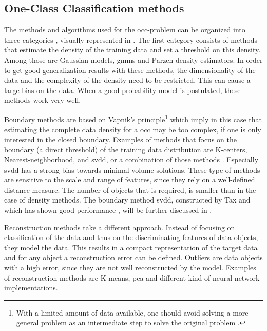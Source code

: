 \subsection{One-Class Classification methods}\label{subsec:occ-methods}
The methods and algorithms used for the \gls{occ}-problem can be organized into three categories \cite{tax2001one,noumir2012simple}, visually represented in .
The first category consists of methods that estimate the density of the training data and set a threshold on this density.
Among those are Gaussian models, \glspl{gmm} and Parzen density estimators.
In order to get good generalization results with these methods, the dimensionality of the data and the complexity of the density need to be restricted.
This can cause a large bias on the data.
When a good probability model is postulated, these methods work very well. %

Boundary methods are based on Vapnik's principle\footnote{With a limited amount of data available, one should avoid solving a more general problem as an intermediate step to solve the original problem \cite{vapnik1998statistical}.} which imply in this case that estimating the complete data density for a \gls{occ} may be too complex, if one is only interested in the closed boundary.
Examples of methods that focus on the boundary (a direct threshold) of the training data distribution are K-centers, Nearest-neighborhood, and \gls{svdd}, or a combination of those methods \cite{hempstalk2008one}.
Especially \gls{svdd} has a strong bias towards minimal volume solutions.
These type of methods are sensitive to the scale and range of features, since they rely on a well-defined distance measure.
The number of objects that is required, is smaller than in the case of density methods.
The boundary method \gls{svdd}, constructed by Tax and which has shown good performance \cite{khan2010survey}, will be further discussed in .

Reconstruction methods take a different approach.
Instead of focusing on classification of the data and thus on the discriminating features of data objects, they model the data.
This results in a compact representation of the target data and for any object a reconstruction error can be defined.
Outliers are data objects with a high error, since they are not well reconstructed by the model.
Examples of reconstruction methods are K-means, \gls{pca} and different kind of neural network implementations.

